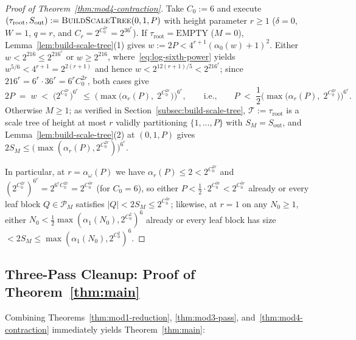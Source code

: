\documentclass[11pt]{article}
\theoremstyle{definition}
\theoremstyle{remark}
\newcommand{\BuildScaleTree}{\textnormal{\scshape BuildScaleTree}}
\begin{document}
\begin{proof}[Proof of Theorem~\ref{thm:mod4-contraction}]
Take $C_0 := 6$ and execute $(\tau_{\mathrm{root}}, S_{\mathrm{out}}) := \BuildScaleTree(0, 1, P)$ with height parameter $r \ge 1$ ($\delta = 0$, $W = 1$, $q = r$, and $C_r = 2^{C_0^{2r}} = 2^{36^r}$). If $\tau_{\mathrm{root}} = \mathrm{EMPTY}$ ($M = 0$), Lemma~\ref{lem:build-scale-tree}(1) gives $w := 2P < 4^{r+1}(\alpha_0(w) + 1)^2$. Either $w < 2^{216} \le 2^{216^r}$ or $w \ge 2^{216}$, where~\eqref{eq:log-sixth-power} yields $w^{5/6} < 4^{r+1} = 2^{2(r+1)}$ and hence $w < 2^{12(r+1)/5} < 2^{216^r}$; since $216^r = 6^r \cdot 36^r = 6^r C_0^{2r}$, both cases give
\[
2P \;=\; w \;<\; \big(2^{C_0^{2r}}\big)^{6^r} \;\le\; \Big(\max\big(\alpha_r(P),\; 2^{C_0^{2r}}\big)\Big)^{6^r},
\qquad\text{i.e.,}\qquad
P \;<\; \frac{1}{2}\Big(\max\big(\alpha_r(P),\; 2^{C_0^{2r}}\big)\Big)^{6^r}.
\]
Otherwise $M \ge 1$; as verified in Section~\ref{subsec:build-scale-tree}, $\mathcal{T} := \tau_{\mathrm{root}}$ is a scale tree of height at most $r$ validly partitioning $\{1, \dots, P\}$ with $S_M = S_{\mathrm{out}}$, and Lemma~\ref{lem:build-scale-tree}(2) at $(0, 1, P)$ gives $2 S_M \le \big(\max(\alpha_r(P), 2^{C_0^{2r}})\big)^{6^r}$.

In particular, at $r = \alpha_\omega(P)$ we have $\alpha_r(P) \le 2 < 2^{C_0^{2r}}$ and $(2^{C_0^{2r}})^{6^r} = 2^{6^r C_0^{2r}} = 2^{C_0^{3r}}$ (for $C_0 = 6$), so either $P < \frac{1}{2}\cdot 2^{C_0^{3r}} < 2^{C_0^{3r}}$ already or every leaf block $Q \in \mathcal{P}_M$ satisfies $|Q| < 2 S_M \le 2^{C_0^{3r}}$; likewise, at $r = 1$ on any $N_0 \ge 1$, either $N_0 < \frac{1}{2}\max(\alpha_1(N_0), 2^{C_0^2})^6$ already or every leaf block has size $< 2 S_M \le \max(\alpha_1(N_0), 2^{C_0^2})^6$.
\end{proof}

\subsection{Three-Pass Cleanup: Proof of Theorem~\ref{thm:main}}
\label{subsec:master-assembly}

Combining Theorems~\ref{thm:mod1-reduction}, \ref{thm:mod3-pass}, and~\ref{thm:mod4-contraction} immediately yields Theorem~\ref{thm:main}:
\end{document}
